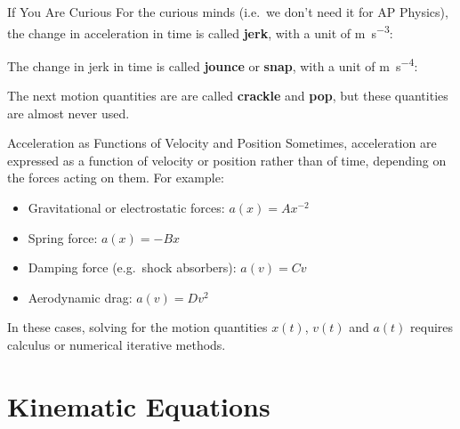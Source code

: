 \documentclass[12pt,compress,aspectratio=169]{beamer}
\newcommand{\mb}[1]{\ensuremath\mathbf{#1}}
\newcommand{\eq}[2]{\vspace{#1}{\Large\begin{displaymath}#2\end{displaymath}}}
\begin{document}
\begin{frame}{If You Are Curious}
  For the curious minds (i.e.\ we don't need it for AP Physics), the change in
  acceleration in time is called \textbf{jerk}, with a unit of
  \si{\metre\per\second^3}:

  \eq{-.2in}{
    \overline{\mb{j}}= \frac{\Delta\mb{a}}{\Delta t}
  }

  The change in jerk in time is called \textbf{jounce} or \textbf{snap}, with a
  unit of \si{\metre\per\second^4}:
  
  \eq{-.2in}{
    \overline{\mb{s}}=\frac{\Delta\mb{j}}{\Delta t}
  }
  
  The next motion quantities are are called \textbf{crackle} and \textbf{pop},
  but these quantities are almost never used.
\end{frame}



\begin{frame}{Acceleration as Functions of Velocity and Position}
  Sometimes, acceleration are expressed as a function of velocity or position
  rather than of time, depending on the forces acting on them. For example:
  \begin{itemize}
  \item Gravitational or electrostatic forces: $a(x)=Ax^{-2}$
  \item Spring force: $\displaystyle a(x)=-Bx$
  \item Damping force (e.g.\ shock absorbers): $a(v)=Cv$
  \item Aerodynamic drag: $a(v)=Dv^2$
  \end{itemize}
  In these cases, solving for the motion quantities $x(t)$, $v(t)$ and $a(t)$
  requires calculus or numerical iterative methods.
\end{frame}



\section{Kinematic Equations}
\end{document}
